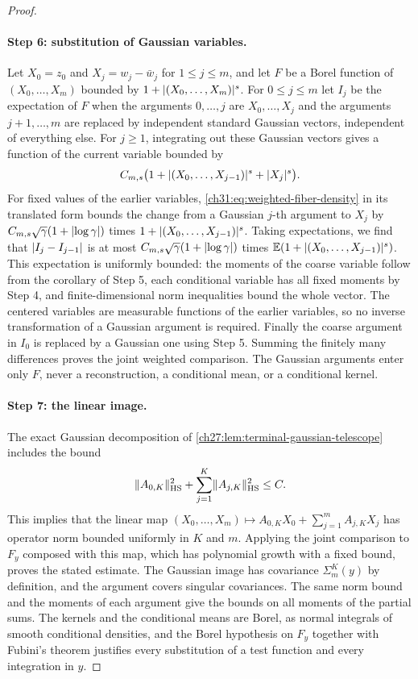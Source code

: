 \begin{proof}
\paragraph{Step 6: substitution of Gaussian variables.}
Let $X_0=z_0$ and $X_j=w_j-\bar w_j$ for $1\le j\le m$, and let $F$ be a Borel function of $(X_0,\dots,X_m)$ bounded by $1+\lvert (X_0,\dots,X_m)\rvert^s$. For $0\le j\le m$ let $I_j$ be the expectation of $F$ when the arguments $0,\dots,j$ are $X_0,\dots,X_j$ and the arguments $j+1,\dots,m$ are replaced by independent standard Gaussian vectors, independent of everything else. For $j\ge1$, integrating out these Gaussian vectors gives a function of the current variable bounded by
\[
 C_{m,s}\bigl(1+\lvert (X_0,\dots,X_{j-1})\rvert^s+\lvert X_j\rvert^s\bigr).
\]
For fixed values of the earlier variables, \eqref{ch31:eq:weighted-fiber-density} in its translated form bounds the change from a Gaussian $j$-th argument to $X_j$ by $C_{m,s}\sqrt\gamma(1+\lvert \log\gamma\rvert)$ times $1+\lvert (X_0,\dots,X_{j-1})\rvert^s$. Taking expectations, we find that $\lvert I_j-I_{j-1}\rvert$ is at most $C_{m,s}\sqrt\gamma(1+\lvert \log\gamma\rvert)$ times $\mathbb E(1+\lvert (X_0,\dots,X_{j-1})\rvert^s)$. This expectation is uniformly bounded: the moments of the coarse variable follow from the corollary of Step 5, each conditional variable has all fixed moments by Step 4, and finite-dimensional norm inequalities bound the whole vector. The centered variables are measurable functions of the earlier variables, so no inverse transformation of a Gaussian argument is required. Finally the coarse argument in $I_0$ is replaced by a Gaussian one using Step 5. Summing the finitely many differences proves the joint weighted comparison. The Gaussian arguments enter only $F$, never a reconstruction, a conditional mean, or a conditional kernel.

\paragraph{Step 7: the linear image.}
The exact Gaussian decomposition of \cref{ch27:lem:terminal-gaussian-telescope} includes the bound
\begin{equation}\label{ch31:eq:row-energy}
 \lVert A_{0,K}\rVert_{\rm HS}^2+\sum_{j=1}^K\lVert A_{j,K}\rVert_{\rm HS}^2\le C.
\end{equation}
This implies that the linear map $(X_0,\dots,X_m)\mapsto A_{0,K}X_0+\sum_{j=1}^mA_{j,K}X_j$ has operator norm bounded uniformly in $K$ and $m$. Applying the joint comparison to $F_y$ composed with this map, which has polynomial growth with a fixed bound, proves the stated estimate. The Gaussian image has covariance $\Sigma_m^K(y)$ by definition, and the argument covers singular covariances. The same norm bound and the moments of each argument give the bounds on all moments of the partial sums. The kernels and the conditional means are Borel, as normal integrals of smooth conditional densities, and the Borel hypothesis on $F_y$ together with Fubini's theorem justifies every substitution of a test function and every integration in $y$.
\end{proof}

